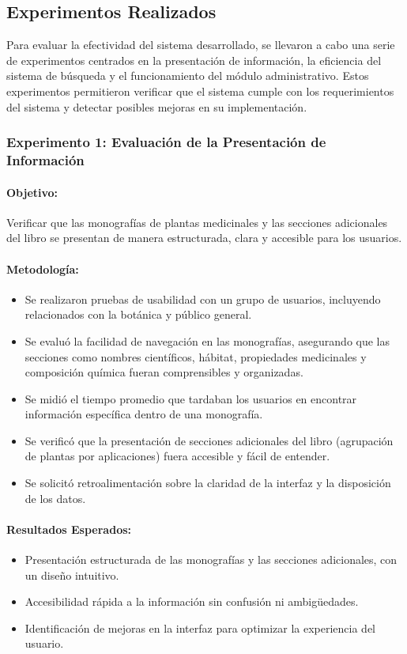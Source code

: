 \subsection{Experimentos Realizados}
Para evaluar la efectividad del sistema desarrollado, se llevaron a cabo una serie de experimentos centrados en la presentación 
de información, la eficiencia del sistema de búsqueda y el funcionamiento del módulo administrativo. Estos experimentos permitieron 
verificar que el sistema cumple con los requerimientos del sistema y detectar posibles mejoras en su implementación.

\subsubsection*{Experimento 1: Evaluación de la Presentación de Información}
\paragraph{Objetivo:}
Verificar que las monografías de plantas medicinales y las secciones adicionales del libro se presentan de manera estructurada, 
clara y accesible para los usuarios.
\paragraph{Metodología:}
\begin{itemize}
    \item Se realizaron pruebas de usabilidad con un grupo de usuarios, incluyendo relacionados con la botánica y público general.
    \item Se evaluó la facilidad de navegación en las monografías, asegurando que las secciones como nombres científicos, hábitat, 
    propiedades medicinales y composición química fueran comprensibles y organizadas.
    \item Se midió el tiempo promedio que tardaban los usuarios en encontrar información específica dentro de una monografía.
    \item Se verificó que la presentación de secciones adicionales del libro (agrupación de plantas por aplicaciones) fuera 
    accesible y fácil de entender.
    \item Se solicitó retroalimentación sobre la claridad de la interfaz y la disposición de los datos.
\end{itemize}
\paragraph{Resultados Esperados:}
\begin{itemize}
    \item Presentación estructurada de las monografías y las secciones adicionales, con un diseño intuitivo.
    \item Accesibilidad rápida a la información sin confusión ni ambigüedades.
    \item Identificación de mejoras en la interfaz para optimizar la experiencia del usuario.
\end{itemize}


